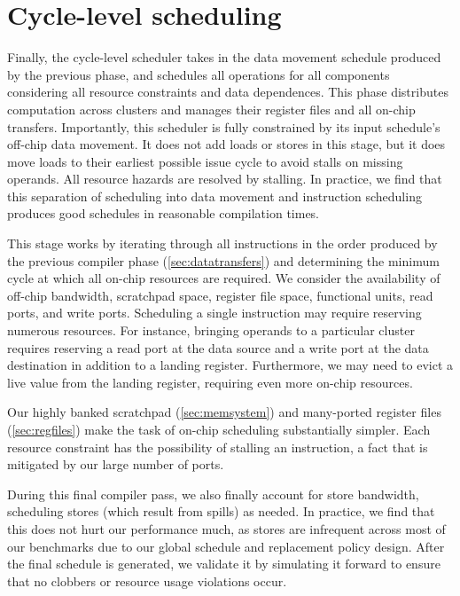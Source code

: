 \section{Cycle-level scheduling}

Finally, the cycle-level scheduler takes in the data movement schedule produced by the previous phase,
and schedules all operations for all components considering all resource constraints and data dependences.
This phase distributes computation across clusters and manages their register files and all on-chip transfers.
Importantly, this scheduler is fully constrained by its input schedule's off-chip data movement. 
It does not add loads or stores in this stage, but it does move loads to
their earliest possible issue cycle to avoid stalls on missing operands.
All resource hazards are resolved by stalling.
In practice, we find that this separation of scheduling into data movement and instruction scheduling produces good schedules in reasonable compilation times.

This stage works by iterating through all instructions in the order produced by the previous compiler phase (\autoref{sec:datatransfers}) and determining the minimum cycle at which all on-chip resources are required. We consider the availability of off-chip bandwidth, scratchpad space, register file space, functional units, read ports, and write ports. Scheduling a single instruction may require reserving numerous resources. For instance, bringing operands to a particular cluster requires reserving a read port at the data source and a write port at the data destination in addition to a landing register. Furthermore, we may need to evict a live value from the landing register, requiring even more on-chip resources.

Our highly banked scratchpad (\autoref{sec:memsystem}) and many-ported register files (\autoref{sec:regfiles}) make the task of on-chip scheduling substantially simpler. Each resource constraint has the possibility of stalling an instruction, a fact that is mitigated by our large number of ports.

During this final compiler pass, we also finally account for store bandwidth, scheduling stores (which result from spills) as needed. In practice, we find that this does not hurt our performance much, as stores are infrequent across most of our benchmarks due to our global schedule and replacement policy design. After the final schedule is generated, we validate it by simulating it forward to ensure that no clobbers or resource usage violations occur.

